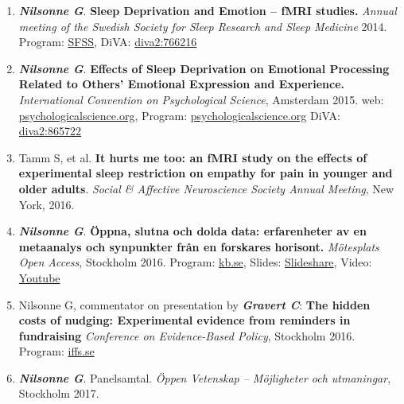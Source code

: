 \documentclass[10pt]{article}
\begin{document}
\begin{enumerate}[nolistsep]
DiVA: \href{http://www.diva-portal.org/smash/record.jsf?pid=diva2\%3A775072\&dswid=3255}{diva2:775072}
\item \textbf{\textit{Nilsonne G}}. \textbf{Sleep Deprivation and Emotion – fMRI studies.} \emph{Annual meeting of the Swedish Society for Sleep Research and Sleep Medicine} 2014.
Program: \href{https://www.delegia.com/app/attendee/default.asp?PageId=29724&MenuItemId=24840&ProjectId=4280}{SFSS}, 
DiVA: \href{http://www.diva-portal.org/smash/record.jsf?pid=diva2\%3A766216\&dswid=9408}{diva2:766216}
\item \textbf{\textit{Nilsonne G}}. \textbf{Effects of Sleep Deprivation on Emotional Processing Related to Others’ Emotional Expression and Experience.} \emph{International Convention on Psychological Science}, Amsterdam 2015.
web: \href{http://www.psychologicalscience.org/convention/icps_program/search/viewProgram.cfm?Abstract_ID=33014}{psychologicalscience.org}, 
Program: \href{http://www.psychologicalscience.org/convention/icps_program/pdf/ICPS-2015-Program_pages-1-128.pdf}{psychologicalscience.org}
DiVA: \href{http://www.diva-portal.org/smash/record.jsf?pid=diva2\%3A865722\&dswid=9414}{diva2:865722}
\item Tamm S, et al. \textbf{It hurts me too: an fMRI study on the effects of experimental sleep restriction on empathy for pain in younger and older adults}. \emph{Social \& Affective Neuroscience Society Annual Meeting}, New York, 2016.
\item \textbf{\textit{Nilsonne G}}. \textbf{Öppna, slutna och dolda data: erfarenheter av en metaanalys och synpunkter från en forskares horisont.} \emph{Mötesplats Open Access}, Stockholm 2016.
Program: \href{http://www.kb.se/Dokument/program_moa_responsiv.pdf}{kb.se}, 
Slides: \href{http://www.slideshare.net/kbredaktion/ppna-slutna-och-dolda-data-erfarenheter-av-en-metaanalys-och-synpunkter-frn-en-forskares-horisont-gustav-nilsonne}{Slideshare}, 
Video: \href{https://www.youtube.com/watch?v=jEfRBOV_KEA\&index=14\&list=PLZVkEICvA5-HRSSr5kb-hswTHUVag5c8P}{Youtube} 
\item Nilsonne G, commentator on presentation by \textbf{\textit{Gravert C}}: \textbf{The hidden costs of nudging: Experimental evidence from reminders in fundraising} \emph{Conference on Evidence-Based Policy}, Stockholm 2016.
Program: \href{http://www.iffs.se/en/calendar/evidensbaserad-policy/}{iffs.se}
\item \textbf{\textit{Nilsonne G}}. Panelsamtal. \emph{Öppen Vetenskap – Möjligheter och utmaningar}, Stockholm 2017.

\end{enumerate}
\end{document}
